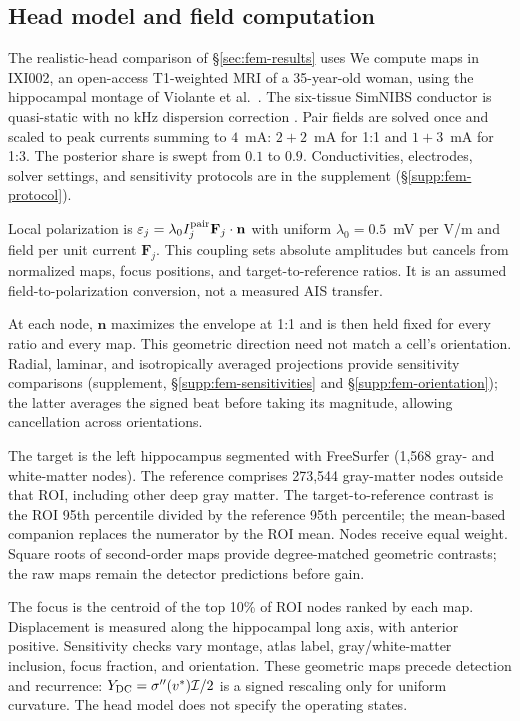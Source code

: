 \documentclass[11pt,a4paper]{article}
\newif\ifjne
\newcommand{\Sig}{\sigma}
\providecommand{\DIFaddtex}[1]{{\protect\color{blue} \sf #1}} %
\providecommand{\DIFdeltex}[1]{{\protect\color{red} \scriptsize #1}} %
\providecommand{\DIFaddbegin}{} %
\providecommand{\DIFdelbegin}{} %
\providecommand{\DIFdelend}{} %
\providecommand{\DIFadd}[1]{\texorpdfstring{\DIFaddtex{#1}}{#1}} %
\providecommand{\DIFdel}[1]{\texorpdfstring{\DIFdeltex{#1}}{}} %
\begin{document}
\subsection{Head model and field computation}\DIFdelbegin %
\DIFdel{The realistic-head comparison of \S\ref{sec:fem-results} uses }\DIFdelend \DIFaddbegin \label{sec:fem-methods}
\ifjne
\DIFadd{We compute maps in IXI002, an open-access T1-weighted MRI of a 35-year-old
woman, using the hippocampal montage of Violante et al.\ \cite{violante2023}.
The six-tissue SimNIBS conductor is quasi-static with no kHz dispersion correction
\cite{salvador2025}. Pair fields are solved once and scaled to peak currents
summing to $4$~mA: $2+2$~mA for 1:1 and $1+3$~mA for 1:3. The posterior share
is swept from $0.1$ to $0.9$. Conductivities, electrodes, solver settings,
and sensitivity protocols are in the supplement (\S\ref{supp:fem-protocol}).
}

\DIFadd{Local polarization is $\varepsilon_j=\lambda_0 I_j^{\rm pair}\mathbf F_j\cdot\mathbf n$
with uniform $\lambda_0=0.5$~mV per V/m \cite{radman2009} and field per unit
current $\mathbf F_j$. This coupling sets absolute amplitudes but cancels from
normalized maps, focus positions, and target-to-reference ratios. It is an
assumed field-to-polarization conversion, not a measured AIS transfer.
}

\DIFadd{At each node, $\mathbf n$ maximizes the envelope at 1:1 and is then held fixed
for every ratio and every map. This geometric direction need not match a cell's
orientation. Radial, laminar, and isotropically averaged projections provide
sensitivity comparisons (supplement, \S\ref{supp:fem-sensitivities} and \S\ref{supp:fem-orientation}); the latter averages the signed beat before taking its magnitude,
allowing cancellation across orientations.
}

\DIFadd{The target is the left hippocampus segmented with FreeSurfer (1,568 gray- and
white-matter nodes). The reference comprises 273,544 gray-matter nodes outside
that ROI, including other deep gray matter. The target-to-reference contrast
is the ROI 95th percentile divided by the reference 95th percentile; the
mean-based companion replaces the numerator by the ROI mean. Nodes receive
equal weight. Square roots of second-order maps provide degree-matched geometric
contrasts; the raw maps remain the detector predictions before gain.
}

\DIFadd{The focus is the centroid of the top 10\% of ROI nodes ranked by each map.
Displacement is measured along the hippocampal long axis, with anterior positive.
Sensitivity checks vary montage, atlas label, gray/white-matter inclusion,
focus fraction, and orientation. These geometric maps precede detection and
recurrence: $Y_{\rm DC}=\Sig''(v^*)\mathcal I/2$ is a signed rescaling only
for uniform curvature. The head model does not specify the operating states.
}
\end{document}

